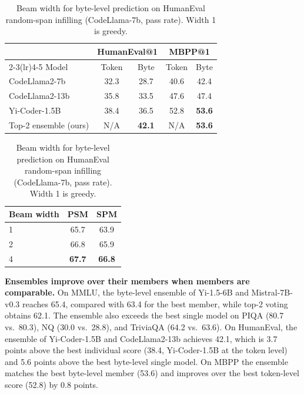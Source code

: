 \documentclass{article} %
\begin{document}
\begin{table}[t]
\begin{minipage}[t]{0.6\textwidth}
\caption{Code LMs on HumanEval and MBPP (pass@1): token-level vs.\ byte-level (ours) predictions and the byte-level top-2 ensemble (ours). Bold: best per benchmark.}
\label{tab:code}
\centering
\small
\setlength{\tabcolsep}{4pt}
\begin{tabular}{lcccc}
\toprule
& \multicolumn{2}{c}{HumanEval@1} & \multicolumn{2}{c}{MBPP@1} \\
\cmidrule(lr){2-3}\cmidrule(lr){4-5}
Model & Token & Byte & Token & Byte \\
\midrule
CodeLlama2-7b & 32.3 & 28.7 & 40.6 & 42.4 \\
CodeLlama2-13b & 35.8 & 33.5 & 47.6 & 47.4 \\
Yi-Coder-1.5B & 38.4 & 36.5 & 52.8 & \textbf{53.6} \\
\midrule
Top-2 ensemble (ours) & N/A & \textbf{42.1} & N/A & \textbf{53.6} \\
\bottomrule
\end{tabular}
\end{minipage}\hfill
\begin{minipage}[t]{0.36\textwidth}
\caption{Beam width for byte-level prediction on HumanEval random-span infilling (CodeLlama-7b, pass rate). Width 1 is greedy.}
\label{tab:beam}
\centering
\small
\begin{tabular}{lcc}
\toprule
Beam width & PSM & SPM \\
\midrule
1 & 65.7 & 63.9 \\
2 & 66.8 & 65.9 \\
4 & \textbf{67.7} & \textbf{66.8} \\
\bottomrule
\end{tabular}
\end{minipage}
\end{table}

\textbf{Ensembles improve over their members when members are comparable.} On MMLU, the byte-level ensemble of Yi-1.5-6B and Mistral-7B-v0.3 reaches 65.4, compared with 63.4 for the best member, while top-2 voting obtains 62.1. The ensemble also exceeds the best single model on PIQA (80.7 vs.\ 80.3), NQ (30.0 vs.\ 28.8), and TriviaQA (64.2 vs.\ 63.6). On HumanEval, the ensemble of Yi-Coder-1.5B and CodeLlama2-13b achieves 42.1, which is 3.7 points above the best individual score (38.4, Yi-Coder-1.5B at the token level) and 5.6 points above the best byte-level single model. On MBPP the ensemble matches the best byte-level member (53.6) and improves over the best token-level score (52.8) by 0.8 points.
\end{document}

